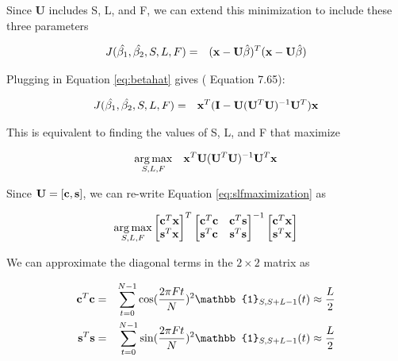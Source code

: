 \documentclass[11pt]{article}
\theoremstyle{plain}
\theoremstyle{definition}
\DeclareMathOperator*{\argmax}{arg\,max}
\begin{document}
\noindent Since {\bf U} includes S, L, and F, we can extend this minimization to include these three parameters

\begin{eqnarray}
\label{eq:extendmin}
	J(\hat{\beta_1}, \hat{\beta_2}, S, L, F) &=& ({\bf x} - {\bf U} \hat{\beta})^T ({\bf x} - {\bf U} \hat{\beta})
\end{eqnarray}

\noindent Plugging in Equation \ref{eq:betahat} gives (\cite{kay1993fundamentals} Equation 7.65):

\begin{eqnarray}
	J(\hat{\beta_1}, \hat{\beta_2}, S, L, F) &=& {\bf x}^T ({\bf I} - {\bf U} ({\bf U}^T {\bf U})^{-1} {\bf U}^T) {\bf x}
\end{eqnarray}

\noindent This is equivalent to finding the values of S, L, and F that maximize 

\begin{eqnarray}
\label{eq:slfmaximization}
	\argmax_{S, L, F} && {\bf x}^{T} {\bf U} ({\bf U}^T {\bf U})^{-1} {\bf U}^T {\bf x}
\end{eqnarray}

\noindent Since ${\bf U} = [{\bf c}, {\bf s}]$, we can re-write Equation \ref{eq:slfmaximization} as

$$
\argmax_{S, L, F}
\begin{bmatrix}
{\bf c}^T {\bf x} \\
{\bf s}^T {\bf x} 
\end{bmatrix}^T
\begin{bmatrix}
{\bf c}^T {\bf c} & {\bf c}^T {\bf s} \\ 
{\bf s}^T {\bf c} & {\bf s}^T {\bf s}
\end{bmatrix}^{-1}
\begin{bmatrix}
{\bf c}^T {\bf x} \\
{\bf s}^T {\bf x} 
\end{bmatrix}
$$

\noindent We can approximate the diagonal terms in the $2 \times 2$ matrix as

\begin{eqnarray}
\label{eq:diagnonalapprox}
	{\bf c}^T {\bf c} &=& \sum_{t=0}^{N-1} \cos(\frac{2 \pi F t}{N})^2 \mathbb{1}_{S, S+L-1}(t) \approx \frac{L}{2} \nonumber \\
	{\bf s}^T {\bf s} &=& \sum_{t=0}^{N-1} \sin(\frac{2 \pi F t}{N})^2 \mathbb{1}_{S, S+L-1}(t) \approx \frac{L}{2} \nonumber 
\end{eqnarray}
\end{document}
